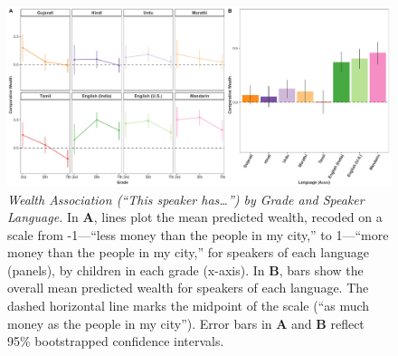 \documentclass{foushee-adapted-preprint}
\begin{document}
\begin{figure}
    \centering
    \includegraphics[width=\linewidth]{figures/combined_plots/combined_wealth_finalized.pdf}
    \caption{\textit{Wealth Association (``This speaker has\ldots'') by Grade and Speaker Language.}
    {In \textbf{A}, lines plot the mean predicted wealth, recoded on a scale from -1---``less money than the people in my city,'' to 1---``more money than the people in my city,'' for speakers of each language (panels), by children in each grade (x-axis). 
    In \textbf{B}, bars show the overall mean predicted wealth for speakers of each language. The dashed horizontal line marks the midpoint of the scale (``as much money as the people in my city''). 
    Error bars in \textbf{A} and \textbf{B} reflect 95\% bootstrapped confidence intervals.}}
    \label{fig:wealth}
\end{figure}
\end{document}
